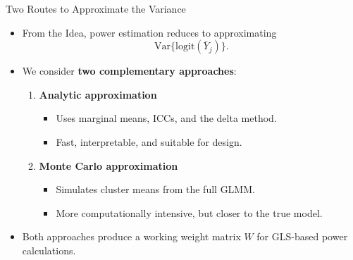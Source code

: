 \documentclass[aspectratio=169]{beamer} %
\begin{document}
\begin{frame}{Two Routes to Approximate the Variance}

\begin{itemize}
  \item From the Idea, power estimation reduces to approximating
    \[
      \mathrm{Var}\{\text{logit}(\bar Y_j)\}.
    \]

  \item We consider \textbf{two complementary approaches}:

  \begin{enumerate}
    \item \textbf{Analytic approximation}
      \begin{itemize}
        \item Uses marginal means, ICCs, and the delta method.
        \item Fast, interpretable, and suitable for design.
      \end{itemize}

    \item \textbf{Monte Carlo approximation}
      \begin{itemize}
        \item Simulates cluster means from the full GLMM.
        \item More computationally intensive, but closer to the true model.
      \end{itemize}
  \end{enumerate}

  \item Both approaches produce a working weight matrix $W$
        for GLS-based power calculations.
\end{itemize}

\end{frame}
\end{document}
